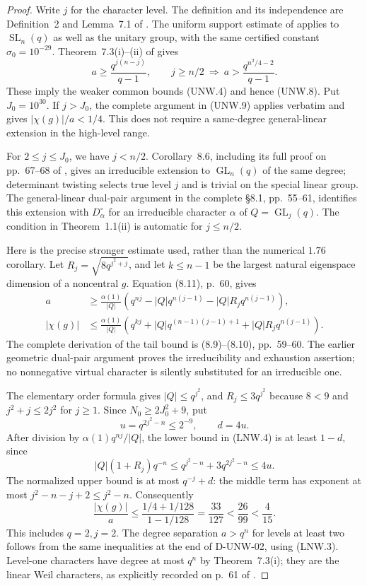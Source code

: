 \begin{proof}
Write $j$ for the character level. The definition and its independence
are Definition~2 and Lemma~7.1 of \cite[pp.~51--52]{UNW:GLT2020}.
The uniform support estimate of \cite[Theorem~5.5, accepted-author
pp.~25--26]{UNW:LT2024} applies to $\operatorname{SL}_n(q)$ as
well as the unitary group, with the same certified constant
$\sigma_0=10^{-29}$. Theorem~7.3(i)--(ii) of
\cite[p.~52]{UNW:GLT2020} gives
\[
 a\ge\frac{q^{j(n-j)}}{q-1},\qquad
 j\ge n/2\ \Longrightarrow\
 a>\frac{q^{n^2/4-2}}{q-1}.                                \tag{LNW.3}
\]
These imply the weaker common bounds (UNW.4) and hence (UNW.8).
Put $J_0=10^{30}$. If $j>J_0$, the complete argument in
(UNW.9) applies verbatim and gives $|\chi(g)|/a<1/4$.
This does not require a same-degree general-linear extension in
the high-level range.

For $2\le j\le J_0$, we have $j<n/2$. Corollary~8.6, including
its full proof on pp.~67--68 of \cite{UNW:GLT2020}, gives an
irreducible extension to $\operatorname{GL}_n(q)$ of the same
degree; determinant twisting selects true level $j$ and is trivial
on the special linear group. The general-linear dual-pair argument
in the complete \S8.1, pp.~55--61, identifies this extension with
$D_\alpha^\circ$ for an irreducible character $\alpha$ of
$Q=\operatorname{GL}_j(q)$. The condition in Theorem~1.1(ii)
is automatic for $j\le n/2$.

Here is the precise stronger estimate used, rather than the
numerical $1.76$ corollary. Let
$R_j=\sqrt{8q^{j^2+j}}$, and let $k\le n-1$ be the largest
natural eigenspace dimension of a noncentral $g$. Equation (8.11),
p.~60, gives
\[
\begin{split}
 a&\ge\frac{\alpha(1)}{|Q|}
  \left(q^{nj}-|Q|q^{n(j-1)}-|Q|R_jq^{n(j-1)}\right),\\
 |\chi(g)|&\le\frac{\alpha(1)}{|Q|}
  \left(q^{kj}+|Q|q^{(n-1)(j-1)+1}
                         +|Q|R_jq^{n(j-1)}\right).
\end{split}                                                    \tag{LNW.4}
\]
The complete derivation of the tail bound is (8.9)--(8.10),
pp.~59--60. The earlier geometric dual-pair argument proves the
irreducibility and exhaustion assertion; no nonnegative virtual
character is silently substituted for an irreducible one.

The elementary order formula gives $|Q|\le q^{j^2}$, and
$R_j\le3q^{j^2}$ because $8<9$ and $j^2+j\le2j^2$ for $j\ge1$.
Since $N_0\ge2J_0^2+9$, put
\[
                   u=q^{2j^2-n}\le2^{-9},\qquad d=4u.
\]
After division by $\alpha(1)q^{nj}/|Q|$, the lower bound in
(LNW.4) is at least $1-d$, since
\[
 |Q|(1+R_j)q^{-n}
 \le q^{j^2-n}+3q^{2j^2-n}\le4u.
\]
The normalized upper bound is at most $q^{-j}+d$: the middle
term has exponent at most $j^2-n-j+2\le j^2-n$.
Consequently
\[
 \frac{|\chi(g)|}{a}
 \le\frac{1/4+1/128}{1-1/128}
 =\frac{33}{127}<\frac{26}{99}<\frac4{15}.                 \tag{LNW.5}
\]
This includes $q=2,j=2$. The degree separation $a>q^n$ for
levels at least two follows from the same inequalities at the end
of D-UNW-02, using (LNW.3). Level-one characters have degree at
most $q^n$ by Theorem~7.3(i); they are the linear Weil characters,
as explicitly recorded on p.~61 of \cite{UNW:GLT2020}.


\end{proof}
